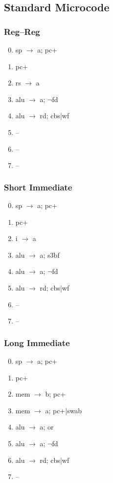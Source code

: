 \documentclass[11pt]{book}
\begin{document}
\subsection*{Standard Microcode}
\begin{multicols}{3}\ttfamily\selectfont\small
  \subsubsection*{Reg--Reg}
  \begin{enumerate}\setcounter{enumi}{-1}
  \item sp \(\rightarrow\) a; pc+
  \item pc+
  \item rs \(\rightarrow\) a
  \item alu \(\rightarrow\) a; \(\neg\)fd
  \item alu \(\rightarrow\) rd; cbs|wf
  \item --
  \item --
  \item --
  \end{enumerate}
  \columnbreak
  \subsubsection*{Short Immediate}
  \begin{enumerate}\setcounter{enumi}{-1}
  \item sp \(\rightarrow\) a; pc+
  \item pc+
  \item i \(\rightarrow\) a
  \item alu \(\rightarrow\) a; s3bf
  \item alu \(\rightarrow\) a; \(\neg\)fd
  \item alu \(\rightarrow\) rd; cbs|wf
  \item --
  \item --
  \end{enumerate}
  \columnbreak
  \subsubsection*{Long Immediate}
  \begin{enumerate}\setcounter{enumi}{-1}
  \item sp \(\rightarrow\) a; pc+
  \item pc+
  \item mem \(\rightarrow\) b; pc+
  \item mem \(\rightarrow\) a; pc+|swab
  \item alu \(\rightarrow\) a; or
  \item alu \(\rightarrow\) a; \(\neg\)fd
  \item alu \(\rightarrow\) rd; cbs|wf
  \item --
  \end{enumerate}
\end{multicols}
\end{document}
